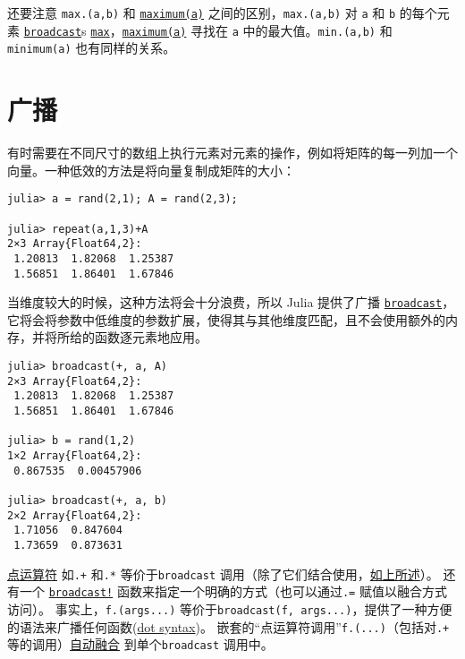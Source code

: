还要注意 \texttt{max.(a,b)} 和 \hyperlink{14719513931696680717}{\texttt{maximum(a)}} 之间的区别，\texttt{max.(a,b)} 对 \texttt{a} 和 \texttt{b} 的每个元素 \hyperlink{616124539803111168}{\texttt{broadcast}}s \hyperlink{7839419811914289844}{\texttt{max}}，\hyperlink{14719513931696680717}{\texttt{maximum(a)}} 寻找在 \texttt{a} 中的最大值。\texttt{min.(a,b)} 和 \texttt{minimum(a)} 也有同样的关系。



\hypertarget{14784211786235072140}{}


\section{广播}



有时需要在不同尺寸的数组上执行元素对元素的操作，例如将矩阵的每一列加一个向量。一种低效的方法是将向量复制成矩阵的大小：




\begin{verbatim}
julia> a = rand(2,1); A = rand(2,3);

julia> repeat(a,1,3)+A
2×3 Array{Float64,2}:
 1.20813  1.82068  1.25387
 1.56851  1.86401  1.67846
\end{verbatim}



当维度较大的时候，这种方法将会十分浪费，所以 Julia 提供了广播 \hyperlink{616124539803111168}{\texttt{broadcast}}，它将会将参数中低维度的参数扩展，使得其与其他维度匹配，且不会使用额外的内存，并将所给的函数逐元素地应用。




\begin{verbatim}
julia> broadcast(+, a, A)
2×3 Array{Float64,2}:
 1.20813  1.82068  1.25387
 1.56851  1.86401  1.67846

julia> b = rand(1,2)
1×2 Array{Float64,2}:
 0.867535  0.00457906

julia> broadcast(+, a, b)
2×2 Array{Float64,2}:
 1.71056  0.847604
 1.73659  0.873631
\end{verbatim}



\hyperlink{15967322336376951940}{点运算符} 如\texttt{.+} 和\texttt{.*} 等价于\texttt{broadcast} 调用（除了它们结合使用，\hyperlink{4802910107640435151}{如上所述}）。 还有一个 \hyperlink{7631985657411687574}{\texttt{broadcast!}} 函数来指定一个明确的方式（也可以通过\texttt{.=} 赋值以融合方式访问）。 事实上，\texttt{f.(args...)} 等价于\texttt{broadcast(f, args...)}，提供了一种方便的语法来广播任何函数(\hyperlink{17801130558550430478}{dot syntax})。 嵌套的“点运算符调用”\texttt{f.(...)}（包括对\texttt{.+} 等的调用）\hyperlink{15967322336376951940}{自动融合} 到单个\texttt{broadcast} 调用中。



